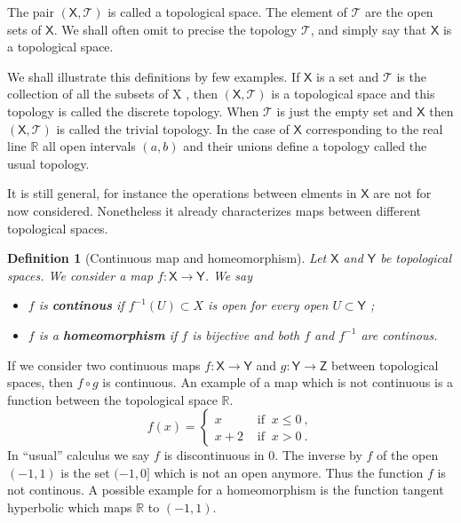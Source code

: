 \documentclass[10pt]{book}
\newcommand{\Tcal}{\mathcal{T}}
\newcommand{\Rbb}{\mathbb{R}}
\newcommand{\Xsf}{\mathsf{X}}
\newcommand{\Ysf}{\mathsf{Y}}
\newcommand{\Zsf}{\mathsf{Z}}
\theoremstyle{break}
\newtheorem{definition}{Definition}
\begin{document}
The pair $(\Xsf,\Tcal)$ is called a topological space. The element of $\Tcal$ are the open sets of $\Xsf$. We shall often omit to precise the topology $\Tcal$, and simply say that $\Xsf$ is a topological space. 


\bigskip


We shall illustrate this definitions by few examples. If $\Xsf$ is a set and $\Tcal$ is the collection of all the subsets of X , then $(\Xsf,\Tcal)$ is a topological space and this topology is called the discrete topology. When $\Tcal$ is just the empty set and $\Xsf$ then $(\Xsf,\Tcal)$ is called the trivial topology. In the case of $\Xsf$ corresponding to the real line $\Rbb$ all open intervals $(a,b)$ and their unions define a topology called the usual topology. 


\bigskip


It is still general, for instance the operations between elments in $\Xsf$ are not for now considered. Nonetheless it already characterizes maps between different topological spaces.


\begin{definition}[Continuous map and homeomorphism]
%
Let $\Xsf$ and $\Ysf$ be topological spaces. We consider a map $f : \Xsf \to \Ysf$. We say
%
\begin{itemize}
\item $f$ is \textbf{continous} if $f^{-1}(U) \subset X$ is open for every open $U \subset\Ysf$ ;
\item $f$ is a \textbf{homeomorphism} if $f$ is bijective and both $f$ and $f^{-1}$ are continous.
\end{itemize}
%
\end{definition}


If we consider two continuous maps $f : \Xsf \to \Ysf$ and $g : \Ysf \to \Zsf$ between topological spaces, then $f \circ g$ is continuous. An example of a map which is not continuous is a function between the topological space $\Rbb$.
%
\begin{equation*}
f(x) = \left\{
\begin{array}{ll}
x & \mbox{ if } \ x \leq 0 \ , \\
x + 2 & \mbox{ if } \ x > 0 \ .
\end{array}
\right.
\end{equation*}
%
In ``usual'' calculus we say $f$ is discontinuous in $0$. The inverse by $f$ of the open $(-1,1)$ is the set $(-1,0]$ which is not an open anymore. Thus the function $f$ is not continous. A possible example for a homeomorphism is the function tangent hyperbolic which maps $\Rbb$ to $(-1,1)$.
\end{document}
